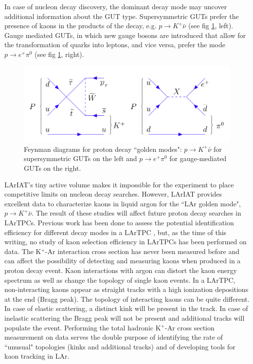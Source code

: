 In case of nucleon decay discovery, the dominant decay mode may uncover additional information about the GUT type.  Supersymmetric GUTs \cite{Dimopoulos:1981dw,Bajc20161} prefer the presence of kaons in the products of the decay, e.g. $p\rightarrow K^+\bar{\nu}$  (see fig \ref{fig:MandatoryFeynmannDiagrams}, left).
Gauge mediated GUTs, in which new gauge bosons are introduced that allow for the transformation of quarks into leptons, and vice versa, prefer the mode $p\rightarrow e^+\pi^0$ (see fig \ref{fig:MandatoryFeynmannDiagrams}, right).



\begin{figure}[hbpt]
\centering
\includegraphics[width=6.5in]{Chapter-1/Images/MandatoryFeynmannDiagrams.png}
\caption{Feynman diagrams for proton decay ``golden modes": $p \rightarrow K^+ \bar{\nu}$ for supersymmetric GUTs on the left and  $p \rightarrow e^+ \pi^0$ for gauge-mediated GUTs  on the right.}
\label{fig:MandatoryFeynmannDiagrams}
\end{figure}


LArIAT's tiny active volume makes it impossible for the experiment to place competitive limits on nucleon decay searches.  However,  LArIAT provides excellent data to characterize kaons in liquid argon for the ``LAr golden mode", $p \rightarrow K^+ \bar{\nu}$.  The result of these studies will affect future proton decay searches in LArTPCs.  Previous work has been done to assess the potential identification efficiency for different decay modes in a LArTPC \cite{Bueno2007}, but, as the time of this  writing, no study of kaon selection efficiency in LArTPCs has been performed on data. 
The K$^+$-Ar interaction cross section has never been measured before and can affect the possibility of detecting and measuring kaons when produced in a proton decay event. 
Kaon interactions with argon can distort the kaon energy spectrum as well as change the topology of single kaon events. In a LArTPC, non-interacting kaons appear as straight tracks with a high ionization depositions at the end (Bragg peak). The topology of interacting kaons can be quite different. In case of elastic scattering, a distinct kink will be present in the track. In case of inelastic scattering the Bragg peak will not be present and additional tracks will populate the event.
Performing the total hadronic K$^+$-Ar cross section measurement on data serves the double purpose of identifying the rate of ``unusual" topologies (kinks and additional tracks) and of developing tools for kaon tracking in LAr.

